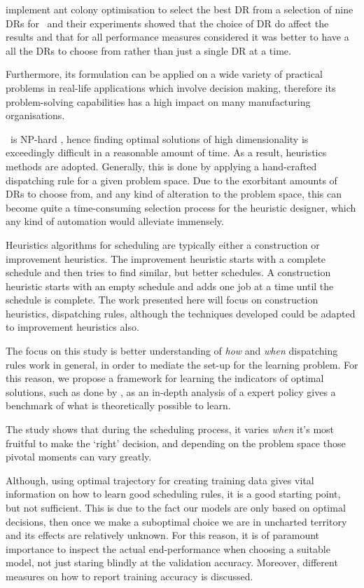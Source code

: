 \documentclass[smallextended]{svjour3}
\begin{document}
\cite{Korytkowski13} implement ant colony optimisation to select the best DR 
from a selection of nine DRs for \JSP~and their experiments showed that the 
choice of DR do affect the results and that for all performance measures 
considered it was better to have a all the DRs to choose from rather than just 
a single DR at a time. 	

Furthermore, its formulation can be applied on a wide variety of practical 
problems in real-life applications which involve decision making, therefore its
problem-solving capabilities has a high impact on many manufacturing 
organisations.

\JSP~is NP-hard \cite{Garey76:NPhard}, hence finding optimal solutions of high 
dimensionality is exceedingly difficult in a reasonable amount of time. 
As a result, heuristics methods are adopted. Generally, this is done by 
applying a hand-crafted dispatching rule for a given problem space. 
Due to the exorbitant amounts of DRs to choose from, and any kind of alteration 
to the problem space, this can become quite a time-consuming selection process 
for the heuristic designer, which any kind of automation would alleviate 
immensely. 

Heuristics algorithms for scheduling are typically either a construction or 
improvement heuristics. The improvement heuristic starts with a complete 
schedule and then tries to find similar, but better schedules.  A construction 
heuristic starts with an empty schedule and adds one job at a time until the 
schedule is complete. The work presented here will focus on construction 
heuristics, dispatching rules, although the techniques developed could be adapted to improvement
heuristics also. 

The focus on this study is better understanding of \emph{how} and \emph{when} 
dispatching rules work in general, in order to mediate the set-up for the 
learning problem.
For this reason, we propose a framework for learning the indicators of optimal 
solutions, such as done by \cite{Siggi10}, as an in-depth analysis of a expert 
policy gives a benchmark of what is theoretically possible to learn. 

The study shows that during the scheduling process, it varies \emph{when} it's 
most fruitful to make the `right' decision, and depending on the problem space 
those pivotal moments can vary greatly. 

Although, using optimal trajectory for creating training data gives vital 
information on how to learn good scheduling rules, it is a good starting point, 
but not sufficient. This is due to the fact our models are only based on 
optimal decisions, then once we make a suboptimal choice we are in uncharted 
territory and its effects are relatively unknown. For this reason, it is of 
paramount importance to inspect the actual end-performance when choosing a 
suitable model, not just staring blindly at the validation accuracy. Moreover, 
different measures on how to report training accuracy is discussed.
\end{document}
